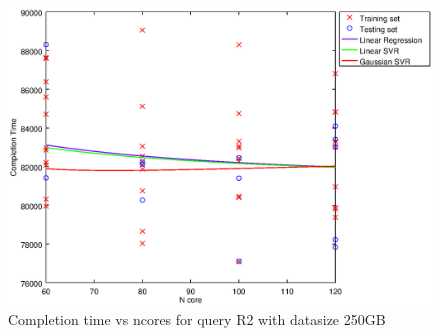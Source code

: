 
\begin {figure}[hbtp]
\centering
\includegraphics[width=\textwidth]{output/R2_250_1_OVER_NCORES/plot_R2_250_bestmodels.eps}
\caption{Completion time vs ncores for query R2 with datasize 250GB}
\label{fig:all_nonlinear_R2_250}
\end {figure}
